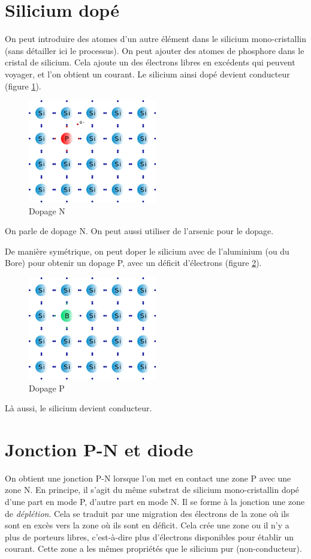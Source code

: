 \documentclass[a4paper,11pt]{book}
\theoremstyle{definition}
\begin{document}
\section{Silicium dopé}
On peut introduire des atomes d'un autre élément dans le silicium mono-cristallin (sans détailler ici le processus). On peut ajouter des atomes de phosphore dans le cristal de silicium. Cela ajoute un des électrons libres en excédents qui peuvent voyager, et l'on obtient un courant. Le silicium ainsi dopé devient conducteur (figure \ref{fig:dopageN}).

\begin{figure}[h]
\centering
\includegraphics[width=0.5\textwidth]{media/Semicon/600px-N-doped_Si.svg.png}
\caption{Dopage N}
\label{fig:dopageN}
\end{figure}
On parle de dopage N. On peut aussi utiliser de l'arsenic pour le dopage.

De manière symétrique, on peut doper le silicium avec de l'aluminium (ou du Bore) pour obtenir un dopage P, avec un déficit d'électrons (figure \ref{fig:dopageP}).

\begin{figure}[h]
\centering
\includegraphics[width=0.5\textwidth]{media/Semicon/600px-P-doped_Si.svg.png}
\caption{Dopage P}
\label{fig:dopageP}
\end{figure}

Là aussi, le silicium devient conducteur.

\section{Jonction P-N et diode}
On obtient une jonction P-N lorsque l'on met en contact une zone P avec une zone N. En principe, il s'agit du même substrat de silicium mono-cristallin dopé d'une part en mode P, d'autre part en mode N. Il se forme à la jonction une zone de \emph{déplétion}. Cela se traduit par une migration des électrons de la zone où ils sont en excès vers la zone où ils sont en déficit. Cela crée une zone ou il n'y a plus de porteurs libres, c'est-à-dire plus d'électrons disponibles pour établir un courant. Cette zone a les mêmes propriétés que le silicium pur (non-conducteur).
\end{document}
